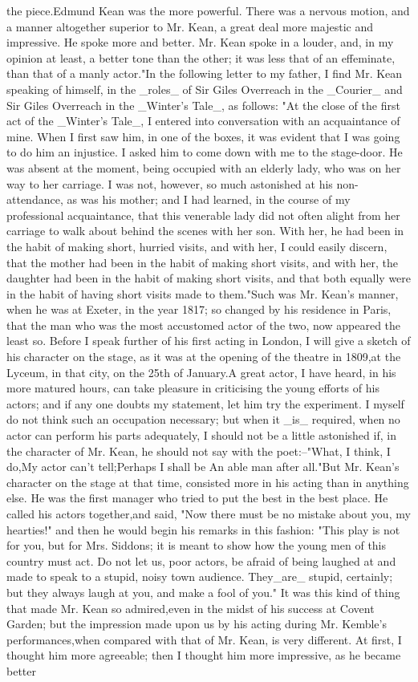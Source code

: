 \documentclass[a4paper]{article}
\begin{document}
the piece.Edmund Kean was the more powerful. There was a nervous motion, and a manner altogether superior to Mr. Kean, a great deal more majestic and impressive. He spoke more and better. Mr. Kean spoke in a louder, and, in my opinion at least, a better tone than the other; it was less that of an effeminate, than that of a manly actor."In the following letter to my father, I find Mr. Kean speaking of himself, in the _roles_ of Sir Giles Overreach in the _Courier_ and Sir Giles Overreach in the _Winter's Tale_, as follows: "At the close of the first act of the _Winter's Tale_, I entered into conversation with an acquaintance of mine. When I first saw him, in one of the boxes, it was evident that I was going to do him an injustice. I asked him to come down with me to the stage-door. He was absent at the moment, being occupied with an elderly lady, who was on her way to her carriage. I was not, however, so much astonished at his non-attendance, as was his mother; and I had learned, in the course of my professional acquaintance, that this venerable lady did not often alight from her carriage to walk about behind the scenes with her son. With her, he had been in the habit of making short, hurried visits, and with her, I could easily discern, that the mother had been in the habit of making short visits, and with her, the daughter had been in the habit of making short visits, and that both equally were in the habit of having short visits made to them."Such was Mr. Kean's manner, when he was at Exeter, in the year 1817; so changed by his residence in Paris, that the man who was the most accustomed actor of the two, now appeared the least so. Before I speak further of his first acting in London, I will give a sketch of his character on the stage, as it was at the opening of the theatre in 1809,at the Lyceum, in that city, on the 25th of January.A great actor, I have heard, in his more matured hours, can take pleasure in criticising the young efforts of his actors; and if any one doubts my statement, let him try the experiment. I myself do not think such an occupation necessary; but when it _is_ required, when no actor can perform his parts adequately, I should not be a little astonished if, in the character of Mr. Kean, he should not say with the poet:--"What, I think, I do,My actor can't tell;Perhaps I shall be An able man after all."But Mr. Kean's character on the stage at that time, consisted more in his acting than in anything else. He was the first manager who tried to put the best in the best place. He called his actors together,and said, "Now there must be no mistake about you, my hearties!" and then he would begin his remarks in this fashion: "This play is not for you, but for Mrs. Siddons; it is meant to show how the young men of this country must act. Do not let us, poor actors, be afraid of being laughed at and made to speak to a stupid, noisy town audience. They_are_ stupid, certainly; but they always laugh at you, and make a fool of you." It was this kind of thing that made Mr. Kean so admired,even in the midst of his success at Covent Garden; but the impression made upon us by his acting during Mr. Kemble's performances,when compared with that of Mr. Kean, is very different. At first, I thought him more agreeable; then I thought him more impressive, as he became better 
\end{document}

